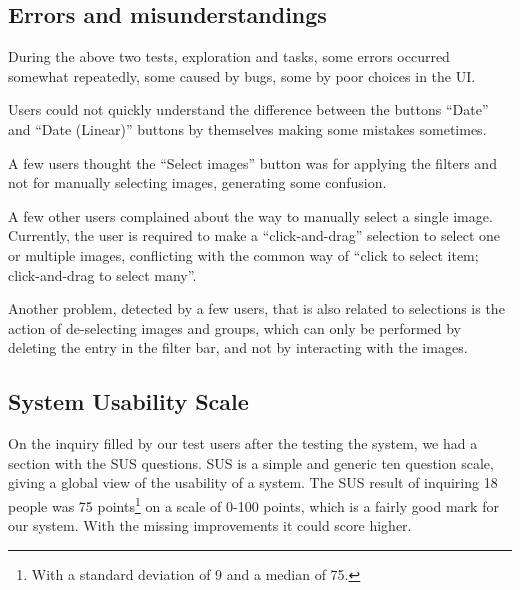 \subsection{Errors and misunderstandings} %

During the above two tests, exploration and tasks, some errors occurred somewhat repeatedly, some caused by bugs, some by poor choices in the \ac{UI}.

Users could not quickly understand the difference between the buttons ``Date'' and ``Date (Linear)'' buttons by themselves making some mistakes sometimes.

A few users thought the ``Select images'' button was for applying the filters and not for manually selecting images, generating some confusion.

A few other users complained about the way to manually select a single image. Currently, the user is required to make a ``click-and-drag'' selection to select one or multiple images, conflicting with the common way of ``click to select item; click-and-drag to select many''.

Another problem, detected by a few users, that is also related to selections is the action of de-selecting images and groups, which can only be performed by deleting the entry in the filter bar, and not by interacting with the images.  





\subsection{System Usability Scale}

On the inquiry filled by our test users after the testing the system, we had a section with the \acf{SUS} questions. \ac{SUS}\cite{Brooke:1996ua} is a simple and generic ten question scale, giving a global view of the usability of a system. The \ac{SUS} result of inquiring 18 people was 75 points\footnote{With a standard deviation of 9 and a median of 75.} on a scale of 0-100 points, which is a fairly good mark for our system. With the missing improvements it could score higher.

